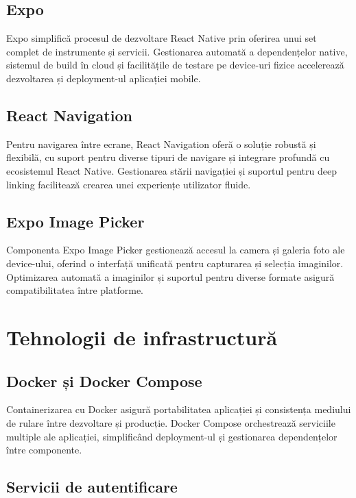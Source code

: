\subsection{Expo}

Expo simplifică procesul de dezvoltare React Native prin oferirea unui set complet de instrumente și servicii. Gestionarea automată a dependențelor native, sistemul de build în cloud și facilitățile de testare pe device-uri fizice accelerează dezvoltarea și deployment-ul aplicației mobile.

\subsection{React Navigation}

Pentru navigarea între ecrane, React Navigation oferă o soluție robustă și flexibilă, cu suport pentru diverse tipuri de navigare și integrare profundă cu ecosistemul React Native. Gestionarea stării navigației și suportul pentru deep linking facilitează crearea unei experiențe utilizator fluide.

\subsection{Expo Image Picker}

Componenta Expo Image Picker gestionează accesul la camera și galeria foto ale device-ului, oferind o interfață unificată pentru capturarea și selecția imaginilor. Optimizarea automată a imaginilor și suportul pentru diverse formate asigură compatibilitatea între platforme.

\section{Tehnologii de infrastructură}

\subsection{Docker și Docker Compose}

Containerizarea cu Docker asigură portabilitatea aplicației și consistența mediului de rulare între dezvoltare și producție. Docker Compose orchestrează serviciile multiple ale aplicației, simplificând deployment-ul și gestionarea dependențelor între componente.

\subsection{Servicii de autentificare}


